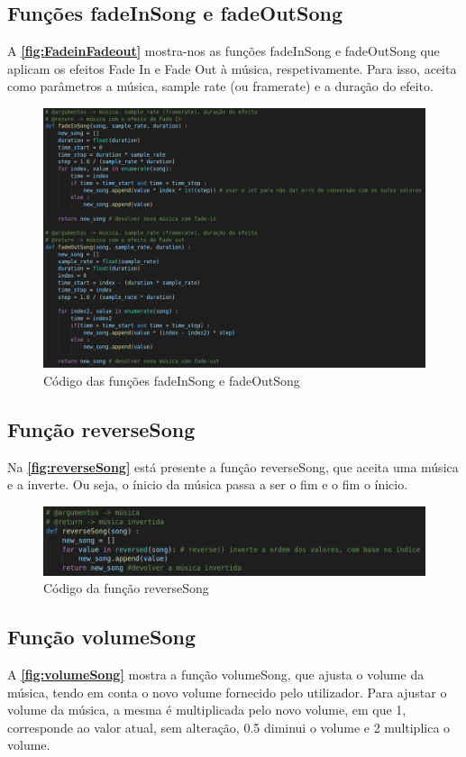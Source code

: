 \documentclass{report}
\begin{document}
\subsection{Funções fadeInSong e fadeOutSong}
\label{ssec:FadeinFadeout}
A \textbf{\autoref{fig:FadeinFadeout}} mostra-nos as funções fadeInSong e fadeOutSong que aplicam os efeitos Fade In e Fade Out 
à música, respetivamente. Para isso, aceita como parâmetros a música, sample rate (ou framerate) e a duração do efeito.

\begin{figure}[!h]
\center 
\includegraphics[width=330pt]{img/fadeInFadeOut.png}
\caption{Código das funções fadeInSong e fadeOutSong}
\label{fig:FadeinFadeout}
\end{figure}

\subsection{Função reverseSong}
\label{ssec:reverseSong}
Na \textbf{\autoref{fig:reverseSong}} está presente a função reverseSong, que aceita uma música e a inverte. Ou seja, 
o ínicio da música passa a ser o fim e o fim o ínicio.

\begin{figure}[!h]
\center 
\includegraphics[width=330pt]{img/reverseSong.png}
\caption{Código da função reverseSong}
\label{fig:reverseSong}
\end{figure}

\subsection{Função volumeSong}
\label{ssec:volumeSong}
A \textbf{\autoref{fig:volumeSong}} mostra a função volumeSong, que ajusta o volume da música, tendo em conta o novo volume 
fornecido pelo utilizador. Para ajustar o volume da música, a mesma é multiplicada pelo novo volume, em que 1, corresponde ao 
valor atual, sem alteração, 0.5 diminui o volume e 2 multiplica o volume.
\end{document}
